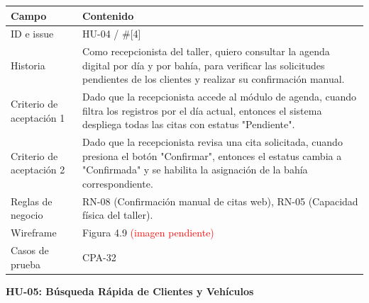 {\def\LTcaptype{none} %
\begin{longtable}[]{@{}
  >{\raggedright\arraybackslash}p{}
  >{\raggedright\arraybackslash}p{}@{}}
\toprule\noalign{}
\begin{minipage}[b]{\linewidth}\raggedright
\textbf{Campo}
\end{minipage} & \begin{minipage}[b]{\linewidth}\raggedright
\textbf{Contenido}
\end{minipage} \\
\midrule\noalign{}
\endhead
\bottomrule\noalign{}
\endlastfoot
ID e issue & HU-04 / \#{[}4{]} \\
Historia & Como recepcionista del taller, quiero consultar la agenda
digital por día y por bahía, para verificar las solicitudes pendientes
de los clientes y realizar su confirmación manual. \\
Criterio de aceptación 1 & Dado que la recepcionista accede al módulo de
agenda, cuando filtra los registros por el día actual, entonces el
sistema despliega todas las citas con estatus "Pendiente". \\
Criterio de aceptación 2 & Dado que la recepcionista revisa una cita
solicitada, cuando presiona el botón "Confirmar", entonces el estatus
cambia a "Confirmada" y se habilita la asignación de la bahía
correspondiente. \\
Reglas de negocio & RN-08 (Confirmación manual de citas web), RN-05
(Capacidad física del taller). \\
Wireframe & Figura 4.9 \textcolor{red}{(imagen pendiente)} \\
Casos de prueba & CPA-32 \\
\end{longtable}
}

\textbf{HU-05: Búsqueda Rápida de Clientes y Vehículos}

